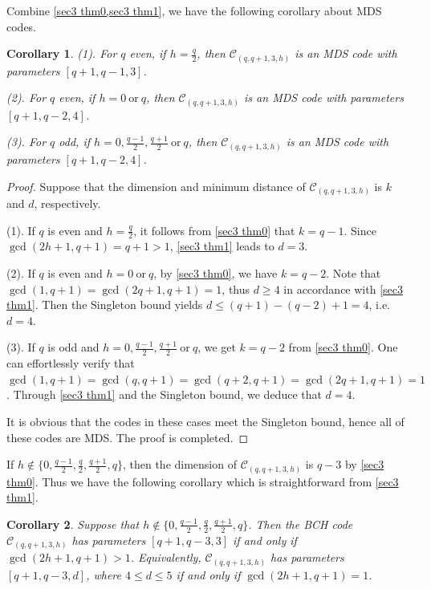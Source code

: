 \documentclass[10pt]{article}%
\newtheorem{corollary}{Corollary}
\begin{document}
	Combine \cref{sec3 thm0,sec3 thm1}, we have the following corollary about MDS codes.
	\begin{corollary}\label{sec3 cor1}
		(1). For $q$ even, if $h=\frac{q}{2}$, then $\mathcal{C}_{(q,q+1,3,h)}$ is an MDS code with parameters $[q+1,q-1,3]$.
		
		(2). For $q$ even, if $h=0\ \mathrm{or}\ q$, then $\mathcal{C}_{(q,q+1,3,h)}$ is an MDS code with parameters $[q+1,q-2,4]$.
		
		(3). For $q$ odd, if $h=0,\frac{q-1}{2},\frac{q+1}{2}\ \mathrm{or}\ q$, then $\mathcal{C}_{(q,q+1,3,h)}$ is an MDS code with parameters $[q+1,q-2,4]$.
	\end{corollary}
	\begin{proof}
		Suppose that the dimension and minimum distance of $\mathcal{C}_{(q,q+1,3,h)}$ is $k$ and $d$, respectively. 
		
		(1). If $q$ is even and $h=\frac{q}{2}$, it follows from \cref{sec3 thm0} that $k=q-1$. Since $\gcd(2h+1,q+1)=q+1>1$, \cref{sec3 thm1} leads to $d=3$.
		
		(2). If $q$ is even and $h=0\ \mathrm{or}\ q$, by \cref{sec3 thm0}, we have $k=q-2$. Note that $\gcd(1,q+1)=\gcd(2q+1,q+1)=1$, thus $d\ge4$ in accordance with \cref{sec3 thm1}. Then the Singleton bound yields $d\le (q+1)-(q-2)+1=4$, i.e. $d=4$.
		
		(3). If $q$ is odd and $h=0,\frac{q-1}{2},\frac{q+1}{2}\ \mathrm{or}\ q$, we get $k=q-2$ from \cref{sec3 thm0}. One can effortlessly verify that $\gcd(1,q+1)=\gcd(q,q+1)=\gcd(q+2,q+1)=\gcd(2q+1,q+1)=1$. Through \cref{sec3 thm1} and the Singleton bound, we deduce that $d=4$.
		
		It is obvious that the codes in these cases meet the Singleton bound, hence all of these codes are MDS. The proof is completed.
	\end{proof}
	
	If $h\notin\{0,\frac{q-1}{2},\frac{q}{2},\frac{q+1}{2},q\}$, then the dimension of $\mathcal{C}_{(q,q+1,3,h)}$ is $q-3$ by \cref{sec3 thm0}. Thus we have the following corollary which is straightforward from \cref{sec3 thm1}.
	\begin{corollary}\label{sec3 cor2}
		Suppose that $h\notin\{0,\frac{q-1}{2},\frac{q}{2},\frac{q+1}{2},q\}$. Then the BCH code $\mathcal{C}_{(q,q+1,3,h)}$ has parameters $[q+1,q-3,3]$ if and only if $\gcd(2h+1,q+1)>1$. Equivalently, $\mathcal{C}_{(q,q+1,3,h)}$ has parameters $[q+1,q-3,d]$, where $4 \le d \le 5$ if and only if $\gcd(2h+1,q+1)=1$.
	\end{corollary}
	
\end{document}
